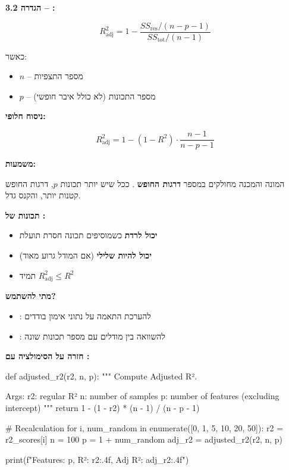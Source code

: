 \textbf{הגדרה \num{3.2} – :}

\begin{equation}
R^2_{\text{adj}} = 1 - \frac{SS_{\text{res}} / (n - p - 1)}{SS_{\text{tot}} / (n - 1)}
\end{equation}

כאשר:
\begin{itemize}
\item $n$ – מספר התצפיות
\item $p$ – מספר התכונות (לא כולל איבר חופשי)
\end{itemize}

\textbf{ניסוח חלופי:}

\begin{equation}
R^2_{\text{adj}} = 1 - (1 - R^2) \cdot \frac{n - 1}{n - p - 1}
\end{equation}

\textbf{משמעות:}

המונה והמכנה מחולקים במספר \textbf{דרגות החופש} . ככל שיש יותר תכונות $p$, דרגות החופש קטנות יותר, והקנס גדל.

\textbf{תכונות של :}

\begin{itemize}
\item \textbf{יכול לרדת} כשמוסיפים תכונה חסרת תועלת
\item \textbf{יכול להיות שלילי} (אם המודל גרוע מאוד)
\item תמיד $R^2_{\text{adj}} \leq R^2$
\end{itemize}

\textbf{מתי להשתמש?}

\begin{itemize}
\item \textbf{\Rsquared{}}: להערכת התאמה על נתוני אימון בודדים
\item \textbf{}: להשוואה בין מודלים עם מספר תכונות שונה
\end{itemize}

\textbf{חזרה על הסימולציה עם :}

\begin{pythonbox}
def adjusted_r2(r2, n, p):
    """
    Compute Adjusted R².

    Args:
        r2: regular R²
        n: number of samples
        p: number of features (excluding intercept)
    """
    return 1 - (1 - r2) * (n - 1) / (n - p - 1)

# Recalculation
for i, num_random in enumerate([0, 1, 5, 10, 20, 50]):
    r2 = r2_scores[i]
    n = 100
    p = 1 + num_random
    adj_r2 = adjusted_r2(r2, n, p)

    print(f"Features: {p}, R²: {r2:.4f}, Adj R²: {adj_r2:.4f}")
\end{pythonbox}

